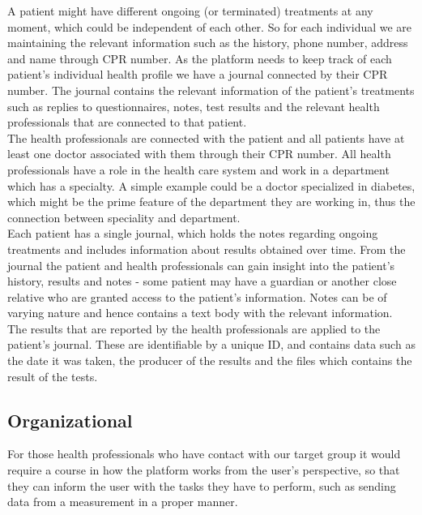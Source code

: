 \documentclass[a4paper,11pt]{article}
\begin{document}
A patient might have different ongoing (or terminated) treatments at any moment, which could be independent of each other. So for each individual we are maintaining the relevant information such as the history, phone number, address and name through CPR number. As the platform needs to keep track of each patient's individual health profile we have a journal connected by their CPR number. The journal contains the relevant information of the patient's treatments such as replies to questionnaires, notes, test results and the relevant health professionals that are connected to that patient.\\

The health professionals are connected with the patient and all patients have at least one doctor associated with them through their CPR number. All health professionals have a role in the health care system and work in a department which has a specialty. A simple example could be a doctor specialized in diabetes, which might be the prime feature of the department they are working in, thus the connection between speciality and department.\\

Each patient has a single journal, which holds the notes regarding ongoing treatments and includes information about results obtained over time. From the journal the patient and health professionals can gain insight into the patient's history, results and notes - some patient may have a guardian or another close relative who are granted access to the patient's information. Notes can be of varying nature and hence contains a text body with the relevant information.\\
 
The results that are reported by the health professionals are applied to the patient's journal. These are identifiable by a unique ID, and contains data such as the date it was taken, the producer of the results and the files which contains the result of the tests.\\

\subsection{Organizational}

For those health professionals who have contact with our target group it would require a course in how the platform works from the user's perspective, so that they can inform the user with the tasks they have to perform, such as sending data from a measurement in a proper manner.\\
\end{document}

